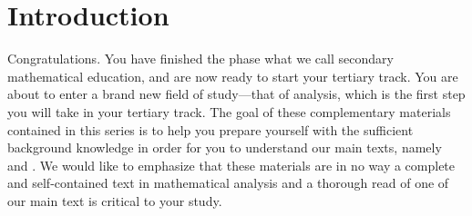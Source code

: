 \documentclass[../main.tex]{subfiles}
\begin{document}
\setcounter{chapter}{0}
\chapter{Introduction}\label{cha:introduction}
Congratulations. You have finished the phase what we call secondary mathematical education, and are now ready to start your tertiary track. You are about to enter a brand new field of study---that of analysis, which is the first step you will take in your tertiary track. The goal of these complementary materials contained in this series is to help you prepare yourself with the sufficient background knowledge in order for you to understand our main texts, namely \cite{babyrudin} and \cite{zorich1}. We would like to emphasize that these materials are in no way a complete and self-contained text in mathematical analysis and a thorough read of one of our main text is critical to your study.


\biblio
\end{document}
